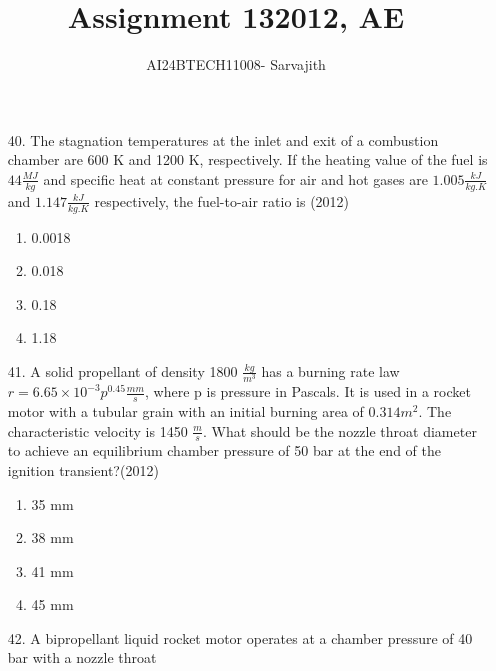 \documentclass[journal]{IEEEtran}
\begin{document}

\vspace{3cm}


\author{AI24BTECH11008- Sarvajith
}
\title{Assignment 13}
{\let\newpage\relax\maketitle}
\title{2012, AE}
\renewcommand{\thefigure}{\theenumi}
\renewcommand{\thetable}{\theenumi}
\setlength{\intextsep}{10pt} %
\renewcommand{\thetable}{\theenumi}
\begin{enumerate}
    \item[40.] The stagnation temperatures at the inlet and exit of a combustion chamber are 600 K and 1200 K,
    respectively. If the heating value of the fuel is $44 \frac{MJ}{kg}$ and specific heat at constant pressure for
    air and hot gases are $1.005\frac{kJ}{kg.K}$ and $1.147\frac{kJ}{kg.K}$ respectively, the fuel-to-air ratio is  \hfill (2012)
    \begin{enumerate}[label=(\Alph*)]
        \item 0.0018
        \item 0.018
        \item 0.18
        \item 1.18
    \end{enumerate}
    \item[41.] A solid propellant of density 1800 $\frac{kg}{m^3}$ has a burning rate law $r = 6.65 \times 10^{-3}p^{0.45} \frac{mm}{s}$, where p is pressure in Pascals. It is used in a rocket motor with a tubular grain with an initial burning area of $0.314 m^2$. The characteristic velocity is 1450 $\frac{m}{s}$. What should be the nozzle throat diameter to achieve an equilibrium chamber pressure of 50 bar at the end of the ignition transient?\hfill (2012)
    \begin{enumerate}[label=(\Alph*)]
        \item 35 mm
        \item 38 mm
        \item 41 mm
        \item 45 mm
    \end{enumerate}
    \item[42.] A bipropellant liquid rocket motor operates at a chamber pressure of 40 bar with a nozzle throat

\end{enumerate}
\end{document}
